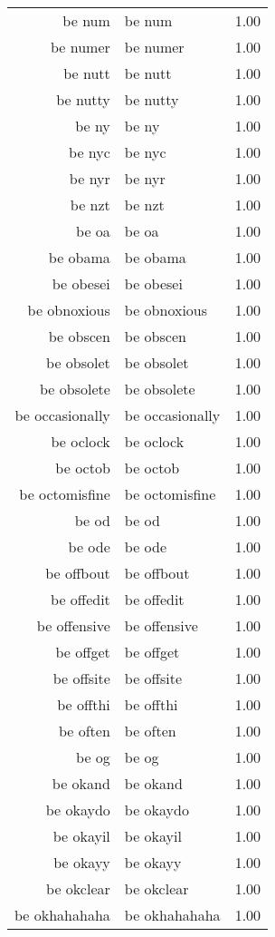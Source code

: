 \begin{table}[ht]
\begin{tabular}{rlr}
  be num & be num & 1.00 \\ 
  be numer & be numer & 1.00 \\ 
  be nutt & be nutt & 1.00 \\ 
  be nutty & be nutty & 1.00 \\ 
  be ny & be ny & 1.00 \\ 
  be nyc & be nyc & 1.00 \\ 
  be nyr & be nyr & 1.00 \\ 
  be nzt & be nzt & 1.00 \\ 
  be oa & be oa & 1.00 \\ 
  be obama & be obama & 1.00 \\ 
  be obesei & be obesei & 1.00 \\ 
  be obnoxious & be obnoxious & 1.00 \\ 
  be obscen & be obscen & 1.00 \\ 
  be obsolet & be obsolet & 1.00 \\ 
  be obsolete & be obsolete & 1.00 \\ 
  be occasionally & be occasionally & 1.00 \\ 
  be oclock & be oclock & 1.00 \\ 
  be octob & be octob & 1.00 \\ 
  be octomisfine & be octomisfine & 1.00 \\ 
  be od & be od & 1.00 \\ 
  be ode & be ode & 1.00 \\ 
  be offbout & be offbout & 1.00 \\ 
  be offedit & be offedit & 1.00 \\ 
  be offensive & be offensive & 1.00 \\ 
  be offget & be offget & 1.00 \\ 
  be offsite & be offsite & 1.00 \\ 
  be offthi & be offthi & 1.00 \\ 
  be often & be often & 1.00 \\ 
  be og & be og & 1.00 \\ 
  be okand & be okand & 1.00 \\ 
  be okaydo & be okaydo & 1.00 \\ 
  be okayil & be okayil & 1.00 \\ 
  be okayy & be okayy & 1.00 \\ 
  be okclear & be okclear & 1.00 \\ 
  be okhahahaha & be okhahahaha & 1.00 \\ 

\end{tabular}
\end{table}
